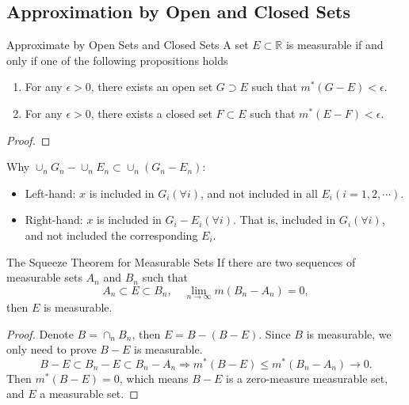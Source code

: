 \subsection{Approximation by Open and Closed Sets}

\begin{theorem}{Approximate by Open Sets and Closed Sets}{}
  A set $E \subset \mathbb{R}$ is measurable if and only if one of the following propositions holds
  \begin{enumerate}
  \item For any $\epsilon > 0$, there exists an open set $G \supset E$ such that
    $m^{\ast}(G - E) < \epsilon$.
  \item For any $\epsilon > 0$, there exists a closed set $F \subset E$ such that
    $m^{\ast}(E - F) < \epsilon$.
  \end{enumerate}
\end{theorem}

\begin{proof}
  
\end{proof}

\begin{note}
  Why $\cup_n G_n - \cup_n E_n \subset \cup_n (G_n - E_n)$:
  \begin{itemize}
  \item Left-hand: $x$ is included in $G_i(\forall i)$, and not included in all $E_i(i=1,2,\cdots)$.
  \item Right-hand: $x$ is included in $G_i - E_i(\forall i)$.
    That is, included in $G_i (\forall i)$, and not included the corresponding $E_i$.
  \end{itemize}
\end{note}

\begin{theorem}{The Squeeze Theorem for Measurable Sets}{}
  If there are two sequences of measurable sets $A_n$ and $B_n$ such that
  \begin{equation}
    A_n \subset E \subset B_n, \quad \lim \limits _{n \rightarrow \infty} m(B_n - A_n) = 0,
  \end{equation}
  then $E$ is measurable.
\end{theorem}

\begin{proof}
  Denote $B = \cap _n B_n$, then $E = B - (B - E)$.
  Since $B$ is measurable, we only need to prove $B - E$ is measurable.
  \begin{equation}
    B - E \subset B_n - E \subset B_n - A_n \Rightarrow m^{\ast}(B - E) \leq m^{\ast}(B_n - A_n) \rightarrow 0.
  \end{equation}
  Then $m^{\ast}(B - E) = 0$, which means $B - E$ is a zero-measure measurable set,
  and $E$ a measurable set.
\end{proof}

